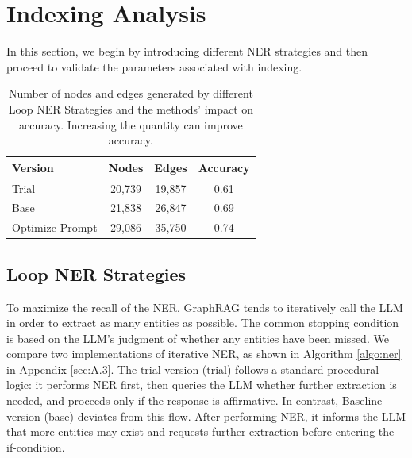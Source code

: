 \documentclass[11pt]{article}
\begin{document}

\section{Indexing Analysis}

In this section, we begin by introducing different NER strategies and then proceed to validate the parameters associated with indexing.

\begin{table}[t]
\centering
\setlength{\tabcolsep}{4pt}
\begin{tabular}{lccc}
\hline
\textbf{Version} & \textbf{Nodes} & \textbf{Edges} & \textbf{Accuracy} \\\hline
Trial & 20,739 & 19,857 & 0.61 \\
Base & 21,838 & 26,847 & 0.69 \\
Optimize Prompt & 29,086 & 35,750 & 0.74 \\\hline 
\end{tabular}
\caption{
Number of nodes and edges generated by different Loop NER Strategies and the methods’ impact on accuracy. Increasing the quantity can improve accuracy.}
\label{tab:ner_bench}
\end{table} 

\subsection{Loop NER Strategies}
To maximize the recall of the NER, GraphRAG tends to iteratively call the LLM in order to extract as many entities as possible. The common stopping condition is based on the LLM's judgment of whether any entities have been missed. We compare two implementations of iterative NER, as shown in Algorithm \ref{algo:ner} in Appendix \ref{sec:A.3}. The trial version (trial) follows a standard procedural logic: it performs NER first, then queries the LLM whether further extraction is needed, and proceeds only if the response is affirmative. In contrast, Baseline version (base) deviates from this flow. After performing NER, it informs the LLM that more entities may exist and requests further extraction before entering the if-condition.
\end{document}
